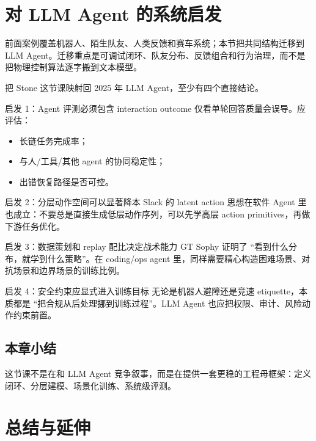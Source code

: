 \documentclass[a4paper]{article}
\begin{document}
\section{对 LLM Agent 的系统启发}

前面案例覆盖机器人、陌生队友、人类反馈和赛车系统；本节把共同结构迁移到 LLM Agent。迁移重点是可调试闭环、队友分布、反馈组合和行为治理，而不是把物理控制算法逐字搬到文本模型。

把 Stone 这节课映射回 2025 年 LLM Agent，至少有四个直接结论。

\begin{importantbox}{启发 1：Agent 评测必须包含 interaction outcome}
仅看单轮回答质量会误导。应评估：
\begin{itemize}
    \item 长链任务完成率；
    \item 与人/工具/其他 agent 的协同稳定性；
    \item 出错恢复路径是否可控。
\end{itemize}
\end{importantbox}

\begin{importantbox}{启发 2：分层动作空间可以显著降本}
Slack 的 latent action 思想在软件 Agent 里也成立：不要总是直接生成低层动作序列，可以先学高层 action primitives，再做下游任务优化。
\end{importantbox}

\begin{importantbox}{启发 3：数据策划和 replay 配比决定战术能力}
GT Sophy 证明了 ``看到什么分布，就学到什么策略''。在 coding/ops agent 里，同样需要精心构造困难场景、对抗场景和边界场景的训练比例。
\end{importantbox}

\begin{warningbox}{启发 4：安全约束应显式进入训练目标}
无论是机器人避障还是竞速 etiquette，本质都是 ``把合规从后处理挪到训练过程''。LLM Agent 也应把权限、审计、风险动作约束前置。
\end{warningbox}

\subsection{本章小结}
这节课不是在和 LLM Agent 竞争叙事，而是在提供一套更稳的工程母框架：定义闭环、分层建模、场景化训练、系统级评测。

\section{总结与延伸}
\end{document}
